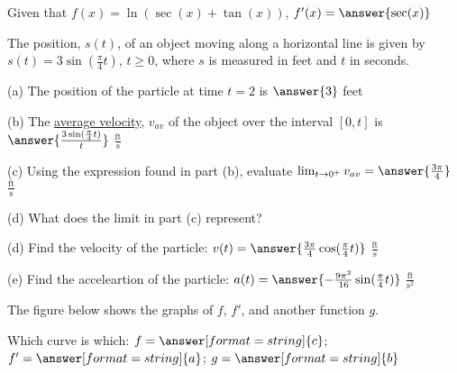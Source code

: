 \documentclass{ximera}
\begin{document}
\begin{exercise}
Given that $f(x)=\ln(\sec(x)+\tan(x))$, $f'(x) = \answer{\sec(x)}$
\end{exercise}


\begin{exercise}
The position, $s(t)$, of an object moving along a horizontal line is given by $s(t)=3\sin\left(\frac{\pi}{4}t\right)$, $t\geq0$, where $s$ is measured in feet and $t$ in seconds.

(a) The position of the particle at time $t=2$ is $\answer{3}$ feet

(b) The \underline{average velocity}, $v_{av}$ of the object over the interval $[0,t]$ is $\answer{\frac{3\sin(\frac{\pi}{4}t)}{t}}$ $\frac{\text{ft}}{\text{s}}$

(c) Using the expression found in part (b), evaluate $\lim_{t\to0^+} v_{av} = \answer{\frac{3\pi}{4}}$ $\frac{\text{ft}}{\text{s}}$

(d) What does the limit in part (c) represent?
\begin{multipleChoice}
\end{multipleChoice}

(d) Find the velocity of the particle: $v(t)=\answer{\frac{3\pi}{4}\cos(\frac{\pi}{4}t)}$ $\frac{\text{ft}}{\text{s}}$

(e) Find the acceleartion of the particle: $a(t)=\answer{-\frac{9\pi^2}{16}\sin(\frac{\pi}{4}t)}$ $\frac{\text{ft}}{\text{s}^2}$

\end{exercise}

\begin{exercise}
The figure below shows the graphs of $f$, $f'$, and another function $g$.
\begin{image}
\end{image}

Which curve is which: $f=\answer[format=string]{c}$; $f'=\answer[format=string]{a}$; $g=\answer[format=string]{b}$
\end{exercise}
\end{document}
